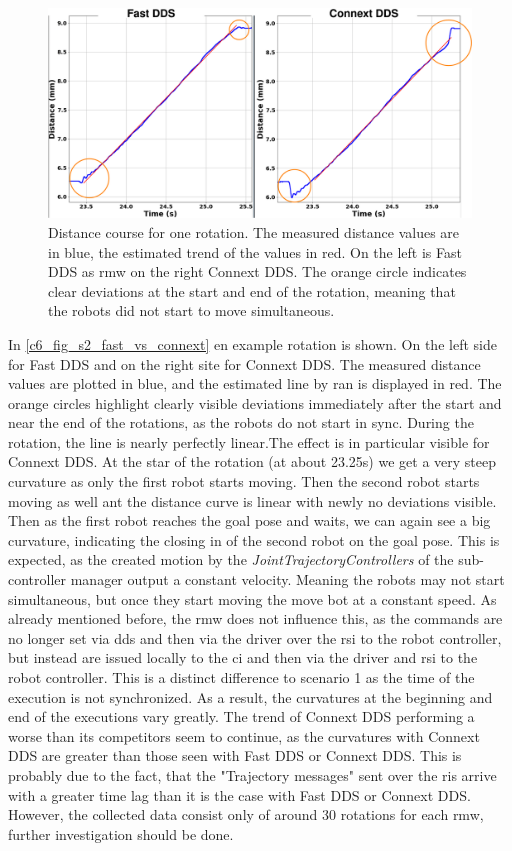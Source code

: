 \begin{figure}[htbp]
	\centering
	\includegraphics[width=1\textwidth]{Figures/c6/s2/s2_fast_vs_connext.png}
	\caption{Distance course for one rotation. The measured distance values are in blue, the estimated trend of the values in red. On the left is Fast DDS as \gls{rmw} on the right Connext DDS. The orange circle indicates clear deviations at the start and end of the rotation, meaning that the robots did not start to move simultaneous.}
	\label{c6_fig_s2_fast_vs_connext}
\end{figure}
In \autoref{c6_fig_s2_fast_vs_connext} en example rotation is shown. On the left side for Fast DDS and on the right site for Connext DDS. The measured distance values are plotted in blue, and the estimated line by \gls{ran} is displayed in red. The orange circles highlight clearly visible deviations immediately after the start and near the end of the rotations, as the robots do not start in sync. During the rotation, the line is nearly perfectly linear.The effect is in particular visible for Connext DDS. At the star of the rotation (at about 23.25s) we get a very steep curvature as only the first robot starts moving. Then the second robot starts moving as well ant the distance curve is linear with newly no deviations visible. Then as the first robot reaches the goal pose and waits, we can again see a big curvature, indicating the closing in of the second robot on the goal pose.\newline
This is expected, as the created motion by the \textit{JointTrajectoryControllers} of the sub-controller manager output a constant velocity. Meaning the robots may not start simultaneous, but once they start moving the move bot at a constant speed. As already mentioned before, the \gls{rmw} does not influence this, as the commands are no longer set via \gls{dds} and then via the driver over the \gls{rsi} to the robot controller, but instead are issued locally to the \gls{ci} and then via the driver and \gls{rsi} to the robot controller. This is a distinct difference to scenario 1 as the time of the execution is not synchronized. As a result, the curvatures at the beginning and end of the executions vary greatly. The trend of Connext DDS performing a worse than its competitors seem to continue, as the curvatures with Connext DDS  are greater than those seen with Fast DDS or Connext DDS. This is probably due to the fact, that the "Trajectory messages" sent over the \glspl{ri} arrive with a greater time lag than it is the case with Fast DDS or Connext DDS. However, the collected data consist only of around 30 rotations for each \gls{rmw}, further investigation should be done.

